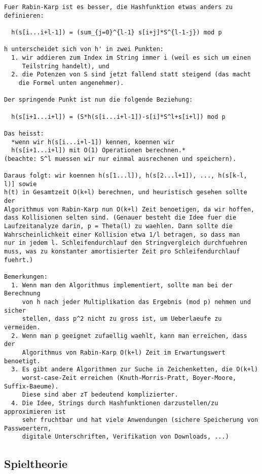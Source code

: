 \begin{verbatim}
Fuer Rabin-Karp ist es besser, die Hashfunktion etwas anders zu definieren:

  h(s[i...i+l-1]) = (sum_{j=0}^{l-1} s[i+j]*S^{l-1-j}) mod p

h unterscheidet sich von h' in zwei Punkten: 
  1. wir addieren zum Index im String immer i (weil es sich um einen 
     Teilstring handelt), und 
  2. die Potenzen von S sind jetzt fallend statt steigend (das macht 
    die Formel unten angenehmer).

Der springende Punkt ist nun die folgende Beziehung:

  h(s[i+1...i+l]) = (S*h(s[i...i+l-1])-s[i]*S^l+s[i+l]) mod p

Das heisst: 
  *wenn wir h(s[i...i+l-1]) kennen, koennen wir
  h(s[i+1...i+l]) mit O(1) Operationen berechnen.*
(beachte: S^l muessen wir nur einmal ausrechenen und speichern).

Daraus folgt: wir koennen h(s[1...l]), h(s[2...l+1]), ..., h(s[k-l, l)] sowie
h(t) in Gesamtzeit O(k+l) berechnen, und heuristisch gesehen sollte der
Algorithmus von Rabin-Karp nun O(k+l) Zeit benoetigen, da wir hoffen, 
dass Kollisionen selten sind. (Genauer besteht die Idee fuer die 
Laufzeitanalyze darin, p = Theta(l) zu waehlen. Dann sollte die
Wahrscheinlichkeit einer Kollision etwa 1/l betragen, so dass man 
nur in jedem l. Schleifendurchlauf den Stringvergleich durchfuehren
muss, was zu konstanter amortisierter Zeit pro Schleifendurchlauf
fuehrt.)

Bemerkungen:
  1. Wenn man den Algorithmus implementiert, sollte man bei der Berechnung
     von h nach jeder Multiplikation das Ergebnis (mod p) nehmen und sicher
     stellen, dass p^2 nicht zu gross ist, um Ueberlaeufe zu vermeiden.
  2. Wenn man p geeignet zufaellig waehlt, kann man erreichen, dass der
     Algorithmus von Rabin-Karp O(k+l) Zeit im Erwartungswert benoetigt.
  3. Es gibt andere Algorithmen zur Suche in Zeichenketten, die O(k+l)
     worst-case-Zeit erreichen (Knuth-Morris-Pratt, Boyer-Moore, Suffix-Baeume).
     Diese sind aber zT bedeutend komplizierter.
  4. Die Idee, Strings durch Hashfunktionen darzustellen/zu approximieren ist
     sehr fruchtbar und hat viele Anwendungen (sichere Speicherung von Passwoertern,
     digitale Unterschriften, Verifikation von Downloads, ...)
\end{verbatim}

\subsection{Spieltheorie}
